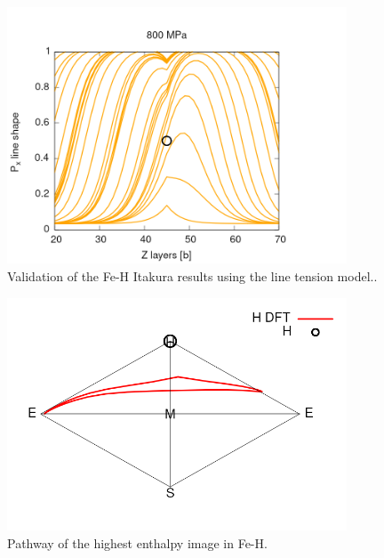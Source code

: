 \documentclass[a4paper,11pt]{article}
\begin{document}
\begin{figure}[htbp]

\includegraphics[width=0.9\textwidth]{Images/H_itakura_800_MPa.png}
\caption{Validation of the Fe-H Itakura results using the line tension model.\label{kinkpairstress}.}
\end{figure} 

\begin{figure}[htbp]

\includegraphics[width=0.9\textwidth]{Images/H_pathway_tol_1e-3.png}
\caption{Pathway of the highest enthalpy image in Fe-H.}
\end{figure}
\end{document}
